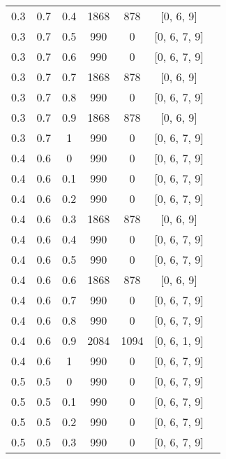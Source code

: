 \begin{table}[H]

	\label{tab:v6}
	\begin{center}

		\begin{tabular}{|c@{\hspace{7mm}}|c@{\hspace{7mm}}|c@{\hspace{7mm}}|c@{\hspace{7mm}}|c@{\hspace{7mm}}|c@{\hspace{7mm}}|c|}

			\hline
0.3  & 0.7  & 0.4  & 1868  & 878   & [0, 6, 9]\\
0.3  & 0.7  & 0.5  & 990   & 0     & [0, 6, 7, 9]\\
0.3  & 0.7  & 0.6  & 990   & 0     & [0, 6, 7, 9]\\
0.3  & 0.7  & 0.7  & 1868  & 878   & [0, 6, 9]\\
0.3  & 0.7  & 0.8  & 990   & 0     & [0, 6, 7, 9]\\
0.3  & 0.7  & 0.9  & 1868  & 878   & [0, 6, 9]\\
0.3  & 0.7  & 1    & 990   & 0     & [0, 6, 7, 9]\\
0.4  & 0.6  & 0    & 990   & 0     & [0, 6, 7, 9]\\
0.4  & 0.6  & 0.1  & 990   & 0     & [0, 6, 7, 9]\\
0.4  & 0.6  & 0.2  & 990   & 0     & [0, 6, 7, 9]\\
0.4  & 0.6  & 0.3  & 1868  & 878   & [0, 6, 9]\\
0.4  & 0.6  & 0.4  & 990   & 0     & [0, 6, 7, 9]\\
0.4  & 0.6  & 0.5  & 990   & 0     & [0, 6, 7, 9]\\
0.4  & 0.6  & 0.6  & 1868  & 878   & [0, 6, 9]\\
0.4  & 0.6  & 0.7  & 990   & 0     & [0, 6, 7, 9]\\
0.4  & 0.6  & 0.8  & 990   & 0     & [0, 6, 7, 9]\\
0.4  & 0.6  & 0.9  & 2084  & 1094  & [0, 6, 1, 9]\\
0.4  & 0.6  & 1    & 990   & 0     & [0, 6, 7, 9]\\
0.5  & 0.5  & 0    & 990   & 0     & [0, 6, 7, 9]\\
0.5  & 0.5  & 0.1  & 990   & 0     & [0, 6, 7, 9]\\
0.5  & 0.5  & 0.2  & 990   & 0     & [0, 6, 7, 9]\\
0.5  & 0.5  & 0.3  & 990   & 0     & [0, 6, 7, 9]\\

\end{tabular}
\end{center}
\end{table}
